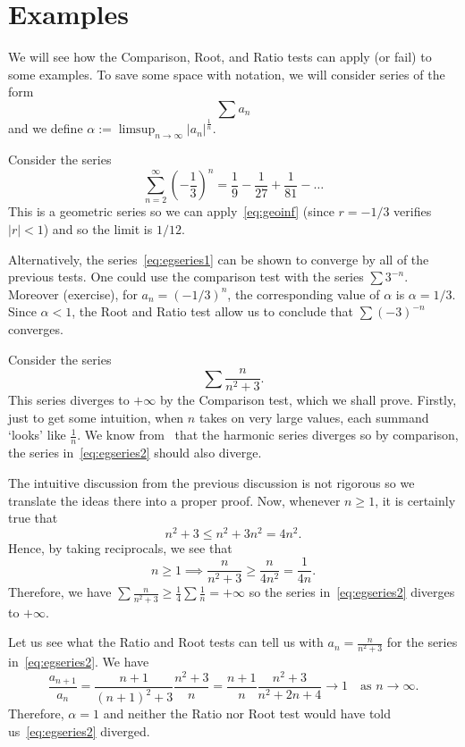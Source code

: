 \section{Examples}
We will see how the Comparison, Root, and Ratio tests can apply (or fail) to some examples. To save some space with notation, we will consider series of the form
\[
\sum a_n
\]
and we define $\alpha := \limsup_{n\to \infty}|a_n|^\frac{1}{n}$.
\begin{eg}
	Consider the series 
	\begin{equation}
		\label{eq:egseries1}
		\sum_{n=2}^\infty \left(-\frac{1}{3}\right)^n = \frac{1}{9} - \frac{1}{27} +\frac{1}{81} - \dots
	\end{equation}
	This is a geometric series so we can apply~\eqref{eq:geoinf} (since $r = -1/3$ verifies $|r|<1$) and so the limit is $1/12$.
	
	Alternatively, the series~\eqref{eq:egseries1} can be shown to converge by all of the previous tests. One could use the comparison test with the series $\sum 3^{-n}$. Moreover (exercise), for $a_n = (-1/3)^n$, the corresponding value of $\alpha$ is $\alpha = 1/3$. Since $\alpha<1$, the Root and Ratio test allow us to conclude that $\sum (-3)^{-n}$ converges.
\end{eg}
\begin{eg}
	Consider the series
	\begin{equation}
		\label{eq:egseries2}
		\sum \frac{n}{n^2+3}.
	\end{equation}
	This series diverges to $+\infty$ by the Comparison test, which we shall prove. Firstly, just to get some intuition, when $n$ takes on very large values, each summand `looks' like $\frac{1}{n}$. We know from~ that the harmonic series diverges so by comparison, the series in~\eqref{eq:egseries2} should also diverge.
	
	The intuitive discussion from the previous discussion is not rigorous so we translate the ideas there into a proper proof. Now, whenever $n\ge 1$, it is certainly true that
	\[
	n^2 + 3 \le n^2 + 3n^2 = 4n^2.
	\]
	Hence, by taking reciprocals, we see that
	\[
	n\ge 1 \implies \frac{n}{n^2 + 3}\ge \frac{n}{4n^2} = \frac{1}{4n}.
	\]
	Therefore, we have $\sum \frac{n}{n^2+3}\ge \frac{1}{4}\sum \frac{1}{n} = +\infty$ so the series in~\eqref{eq:egseries2} diverges to $+\infty$.
	
	Let us see what the Ratio and Root tests can tell us with $a_n = \frac{n}{n^2+3}$ for the series in~\eqref{eq:egseries2}. We have
	\[
	\frac{a_{n+1}}{a_n} = \frac{n+1}{(n+1)^2+3}\frac{n^2+3}{n} =\frac{n+1}{n}\frac{n^2+3}{n^2+2n+4} \to 1\quad \text{as }n\to\infty.
	\]
	Therefore, $\alpha=1$ and neither the Ratio nor Root test would have told us~\eqref{eq:egseries2} diverged.
\end{eg}
